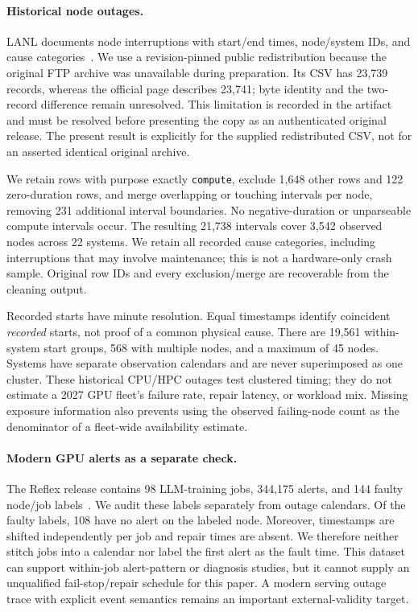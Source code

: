 \documentclass[sigplan,10pt,anonymous,nonacm]{acmart}
\begin{document}
\paragraph{Historical node outages.}
LANL documents node interruptions with start/end times, node/system IDs,
and cause categories~\cite{lanlFailureData,schroeder2006failures}. We use
a revision-pinned public redistribution because the original FTP archive
was unavailable during preparation. Its CSV has 23,739 records, whereas
the official page describes 23,741; byte identity and the two-record
difference remain unresolved. This limitation is recorded in the artifact
and must be resolved before presenting the copy as an authenticated
original release. The present result is explicitly for the supplied
redistributed CSV, not for an asserted identical original archive.

We retain rows with purpose exactly \texttt{compute}, exclude 1,648 other
rows and 122 zero-duration rows, and merge overlapping or touching
intervals per node, removing 231 additional interval boundaries. No
negative-duration or unparseable compute intervals occur. The resulting
21,738 intervals cover 3,542 observed nodes across 22 systems. We retain
all recorded cause categories, including interruptions that may involve
maintenance; this is not a hardware-only crash sample. Original row IDs
and every exclusion/merge are recoverable from the cleaning output.

Recorded starts have minute resolution. Equal timestamps identify
coincident \emph{recorded} starts, not proof of a common physical cause.
There are 19,561 within-system start groups, 568 with multiple nodes,
and a maximum of 45 nodes. Systems have separate observation calendars
and are never superimposed as one cluster. These historical CPU/HPC
outages test clustered timing; they do not estimate a 2027 GPU fleet's
failure rate, repair latency, or workload mix. Missing exposure information
also prevents using the observed failing-node count as the denominator
of a fleet-wide availability estimate.

\paragraph{Modern GPU alerts as a separate check.}
The Reflex release contains 98 LLM-training jobs, 344,175 alerts, and
144 faulty node/job labels~\cite{ding2026reflex,reflexDataset}.
We audit these labels separately from outage calendars.
Of the faulty labels, 108 have no alert on the labeled node. Moreover,
timestamps are shifted independently per job and repair times are absent.
We therefore neither stitch jobs into a calendar nor label the first
alert as the fault time. This dataset can support within-job alert-pattern
or diagnosis studies, but it cannot supply an unqualified fail-stop/repair
schedule for this paper. A modern serving outage trace with explicit
event semantics remains an important external-validity target.
\end{document}
